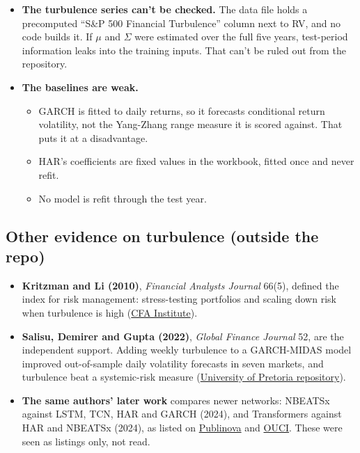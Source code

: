 \documentclass{article}
\begin{document}
\begin{itemize}
\item \textbf{The turbulence series can't be checked.} The data file holds a precomputed ``S\&P 500 Financial Turbulence'' column next to RV, and no code builds it. If $\mu$ and $\Sigma$ were estimated over the full five years, test-period information leaks into the training inputs. That can't be ruled out from the repository.

\item \textbf{The baselines are weak.}

\begin{itemize}

\item GARCH is fitted to daily returns, so it forecasts conditional return volatility, not the Yang-Zhang range measure it is scored against. That puts it at a disadvantage.

\item HAR's coefficients are fixed values in the workbook, fitted once and never refit.

\item No model is refit through the test year.

\end{itemize}

\end{itemize}

\subsection{Other evidence on turbulence (outside the repo)}

\begin{itemize}

\item \textbf{Kritzman and Li (2010)}, \emph{Financial Analysts Journal} 66(5), defined the index for risk management: stress-testing portfolios and scaling down risk when turbulence is high (\href{https://rpc.cfainstitute.org/research/financial-analysts-journal/2010/skulls-financial-turbulence-and-risk-management}{CFA Institute}).

\item \textbf{Salisu, Demirer and Gupta (2022)}, \emph{Global Finance Journal} 52, are the independent support. Adding weekly turbulence to a GARCH-MIDAS model improved out-of-sample daily volatility forecasts in seven markets, and turbulence beat a systemic-risk measure (\href{https://repository.up.ac.za/items/47051c9e-ded9-4528-a489-245319682eb2}{University of Pretoria repository}).

\item \textbf{The same authors' later work} compares newer networks: NBEATSx against LSTM, TCN, HAR and GARCH (2024), and Transformers against HAR and NBEATSx (2024), as listed on \href{https://publinova.nl/product/introducing-nbeatsx-to-realized-volatility-forecasting}{Publinova} and \href{https://ouci.dntb.gov.ua/works/40RgkoW9}{OUCI}. These were seen as listings only, not read.

\end{itemize}
\end{document}
